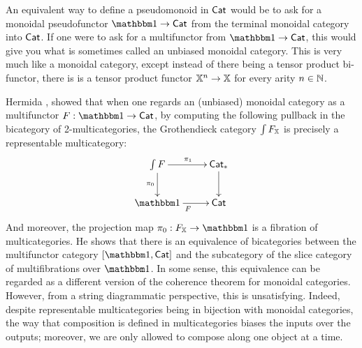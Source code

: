 
An equivalent way to define a pseudomonoid in ${\sf Cat}$ would be to ask for a monoidal pseudofunctor $\one\to \Cat$ from the terminal monoidal category into ${\sf Cat}$.  If one were to ask for a multifunctor from $\one\to \Cat$, this would give you what is sometimes called an unbiased monoidal category. This is very much like a monoidal category, except instead of there being a tensor product bi-functor, there is is a tensor product functor $\mathbb{X}^n\to \mathbb{X}$ for every arity $n \in \mathbb{N}$.


Hermida \cite{hermida}, showed that when one regards an (unbiased) monoidal category as a multifunctor $F:\one\to\Cat$, by computing the following pullback in the bicategory of 2-multicategories, the Grothendieck category $\int F_{\mathbb{X}}$ is precisely a representable multicategory:
$$
\xymatrix{
\int  F \ar[r]^{\pi_1} \ar[d]_{\pi_0} & \Cat_* \ar[d] \\
\one \ar[r]_F & \Cat
}
$$
And moreover, the projection map $\pi_0:F_\X\to \one$ is a fibration of multicategories.  He shows that there is an equivalence of bicategories between the multifunctor category $[\one,\Cat]$ and the subcategory of the slice category of multifibrations over $\one$.  
In some sense, this equivalence can be regarded as a different version of the coherence theorem for monoidal categories.
However, from a string diagrammatic perspective, this is unsatisfying.  Indeed, despite representable multicategories being in bijection with monoidal categories, the way that composition is defined in multicategories biases the inputs over the outputs; moreover, we are only allowed to compose along one object at a time.
